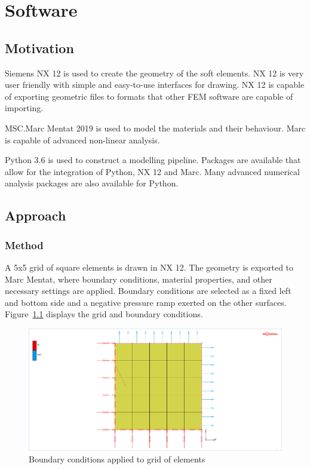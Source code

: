 \chapter{Software}
\label{chp:S}

\section{Motivation}

Siemens NX 12 is used to create the geometry of the soft elements. NX 12 is very user friendly with simple and easy-to-use interfaces for drawing. NX 12 is capable of exporting geometric files to formats that other FEM software are capable of importing.

MSC.Marc Mentat 2019 is used to model the materials and their behaviour. Marc is capable of advanced non-linear analysis.

Python 3.6 is used to construct a modelling pipeline. Packages are available that allow for the integration of Python, NX 12 and Marc. Many advanced numerical analysis packages are also available for Python.

\section{Approach}

\subsection{Method}

A 5x5 grid of square elements is drawn in NX 12. The geometry is exported to Marc Mentat, where boundary conditions, material properties, and other necessary settings are applied. Boundary conditions are selected as a fixed left and bottom side and a negative pressure ramp exerted on the other surfaces. Figure~\ref{fig:bc} displays the grid and boundary conditions.

\begin{figure}
	\includegraphics[width=1\textwidth]{baseelement_full_bc.png}
	\caption{Boundary conditions applied to grid of elements}
	\label{fig:bc}
\end{figure}

